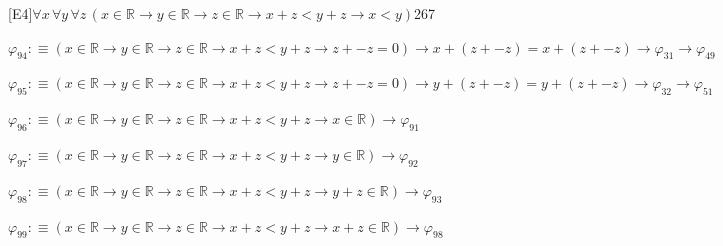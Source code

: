 \begin{fullproof}{[E4]}{$\forall x\,\forall y\,\forall z\,(x \in \mathbb{R} \to y \in \mathbb{R} \to z \in \mathbb{R} \to x + z < y + z \to x < y)$}{267}
\begin{abbrevlist}
\item $\varphi_{94} :\equiv (x \in \mathbb{R} \to y \in \mathbb{R} \to z \in \mathbb{R} \to x + z < y + z \to z + -z = 0) \to x + (z + -z) = x + (z + -z) \to \varphi_{31} \to \varphi_{49}$
\item $\varphi_{95} :\equiv (x \in \mathbb{R} \to y \in \mathbb{R} \to z \in \mathbb{R} \to x + z < y + z \to z + -z = 0) \to y + (z + -z) = y + (z + -z) \to \varphi_{32} \to \varphi_{51}$
\item $\varphi_{96} :\equiv (x \in \mathbb{R} \to y \in \mathbb{R} \to z \in \mathbb{R} \to x + z < y + z \to x \in \mathbb{R}) \to \varphi_{91}$
\item $\varphi_{97} :\equiv (x \in \mathbb{R} \to y \in \mathbb{R} \to z \in \mathbb{R} \to x + z < y + z \to y \in \mathbb{R}) \to \varphi_{92}$
\item $\varphi_{98} :\equiv (x \in \mathbb{R} \to y \in \mathbb{R} \to z \in \mathbb{R} \to x + z < y + z \to y + z \in \mathbb{R}) \to \varphi_{93}$
\item $\varphi_{99} :\equiv (x \in \mathbb{R} \to y \in \mathbb{R} \to z \in \mathbb{R} \to x + z < y + z \to x + z \in \mathbb{R}) \to \varphi_{98}$
\end{abbrevlist}
\end{fullproof}
